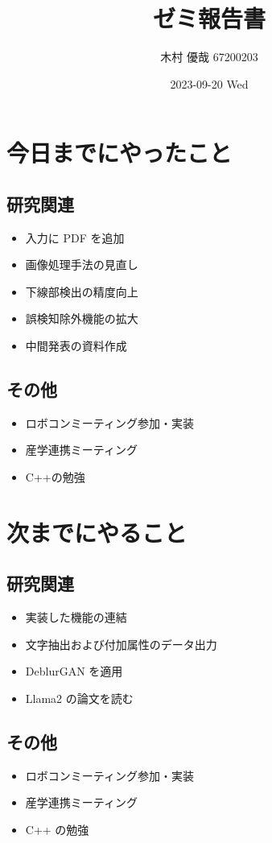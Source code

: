 \documentclass[uplatex, onecolumn, 10pt]{jsarticle}
\begin{document}
\title{\vspace{-40mm}\bf{\LARGE{ゼミ報告書}}}
\author{\vspace{-40mm}木村 優哉 67200203}
\date{2023-09-20 Wed}
\maketitle


\section{今日までにやったこと}

\subsection*{研究関連}
\begin{itemize}
	\item 入力に PDF を追加
	\item 画像処理手法の見直し
	\item 下線部検出の精度向上
	\item 誤検知除外機能の拡大
	\item 中間発表の資料作成
\end{itemize}

\subsection*{その他}
\begin{itemize}
	\item ロボコンミーティング参加・実装
	\item 産学連携ミーティング
	\item C++の勉強
\end{itemize}


\section{次までにやること}

\subsection*{研究関連}
\begin{itemize}
	\item 実装した機能の連結
	\item 文字抽出および付加属性のデータ出力
	\item DeblurGAN を適用
	\item Llama2 の論文を読む
\end{itemize}

\subsection*{その他}
\begin{itemize}
	\item ロボコンミーティング参加・実装
	\item 産学連携ミーティング
	\item C++ の勉強
\end{itemize}
\end{document}
